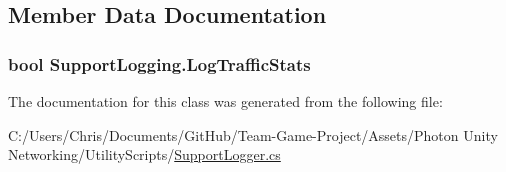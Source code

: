 \subsection{Member Data Documentation}
\subsubsection[{\texorpdfstring{Log\+Traffic\+Stats}{LogTrafficStats}}]{\setlength{\rightskip}{0pt plus 5cm}bool Support\+Logging.\+Log\+Traffic\+Stats}\hypertarget{class_support_logging_a494d8a15f8657d606dd4c1dfbf0b9042}{}\label{class_support_logging_a494d8a15f8657d606dd4c1dfbf0b9042}


The documentation for this class was generated from the following file\+:\begin{DoxyCompactItemize}
\item 
C\+:/\+Users/\+Chris/\+Documents/\+Git\+Hub/\+Team-\/\+Game-\/\+Project/\+Assets/\+Photon Unity Networking/\+Utility\+Scripts/\hyperlink{_support_logger_8cs}{Support\+Logger.\+cs}\end{DoxyCompactItemize}
